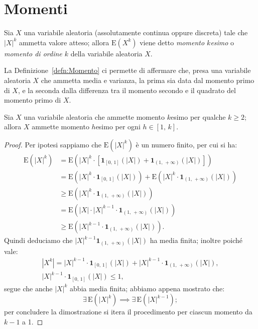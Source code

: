     \section{Momenti}
        \begin{defn}\label{defn:Momento}
            Sia $X$ una variabile aleatoria (assolutamente continua oppure discreta) tale che $|X|^k$ ammetta valore atteso; allora $\text{E}(X^k)$ viene detto \emph{momento $k$\nbdash esimo} o \emph{momento di ordine $k$} della variabile aleatoria $X$.
        \end{defn}
        \begin{obsv}
            La Definizione~\ref{defn:Momento} ci permette di affermare che, presa una variabile aleatoria $X$ che ammetta media e varianza, la prima sia data dal momento primo di $X$, e la seconda dalla differenza tra il momento secondo e il quadrato del  momento primo di $X$.
        \end{obsv}
        \begin{prty}
            Sia $X$ una variabile aleatoria che ammette momento $k$\nbdash esimo per qualche $k \geq 2$; allora $X$ ammette momento $h$\nbdash esimo per ogni $h \in [1,\,k]$.
        \end{prty}
        \begin{proof}
            Per ipotesi sappiamo che $\text{E}(|X|^k)$ è un numero finito, per cui si ha:
            \begin{align*}
                \text{E}(|X|^k) &= \text{E}\left(|X|^k\cdot\left[\mathbf{1}_{[0,\,1]}(|X|) + \mathbf{1}_{(1,\,+\infty)}(|X|)\right]\right) \\
                                &= \text{E}\left(|X|^k\cdot\mathbf{1}_{[0,\,1]}(|X|)\right) + \text{E}\left(|X|^k\cdot\mathbf{1}_{(1,\,+\infty)}(|X|)\right) \\
                                &\geq \text{E}\left(|X|^k\cdot\mathbf{1}_{(1,\,+\infty)}(|X|)\right)\\
                                &= \text{E}\left(|X|\cdot |X|^{k-1}\cdot\mathbf{1}_{(1,\,+\infty)}(|X|)\right) \\
                                &\geq \text{E}\left(|X|^{k-1}\cdot\mathbf{1}_{(1,\,+\infty)}(|X|)\right)
            .\end{align*}
            Quindi deduciamo che $|X|^{k-1}\mathbf{1}_{(1,\,+\infty)}(|X|)$ ha media finita; inoltre poiché vale:
            \begin{gather*}
                |X^k| = |X|^{k-1} \cdot \mathbf{1}_{[0,\,1]} (|X|) + |X|^{k-1}\cdot\mathbf{1}_{(1,\,+\infty)} (|X|), \\
                |X|^{k-1}\cdot\mathbf{1}_{[0,\,1]} (|X|) \leq 1,
            \end{gather*}
            segue che anche $|X|^k$ abbia media finita; abbiamo appena mostrato che: \[
            \exists\, \text{E}(|X|^k) \implies \exists\, \text{E}(|X|^{k-1})
            ;\] per concludere la dimostrazione si itera il procedimento per ciascun momento da $k-1$ a 1.
        \end{proof}
